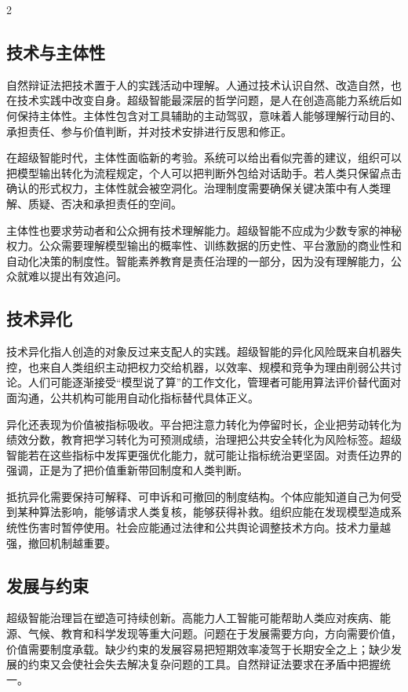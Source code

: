 \documentclass[a4paper,UTF8,zihao=5,twoside]{ctexart}
\begin{document}
\begin{multicols}{2}
\subsection{技术与主体性}

自然辩证法把技术置于人的实践活动中理解。人通过技术认识自然、改造自然，也在技术实践中改变自身。超级智能最深层的哲学问题，是人在创造高能力系统后如何保持主体性。主体性包含对工具辅助的主动驾驭，意味着人能够理解行动目的、承担责任、参与价值判断，并对技术安排进行反思和修正。

在超级智能时代，主体性面临新的考验。系统可以给出看似完善的建议，组织可以把模型输出转化为流程规定，个人可以把判断外包给对话助手。若人类只保留点击确认的形式权力，主体性就会被空洞化。治理制度需要确保关键决策中有人类理解、质疑、否决和承担责任的空间。

主体性也要求劳动者和公众拥有技术理解能力。超级智能不应成为少数专家的神秘权力。公众需要理解模型输出的概率性、训练数据的历史性、平台激励的商业性和自动化决策的制度性。智能素养教育是责任治理的一部分，因为没有理解能力，公众就难以提出有效追问。

\subsection{技术异化}

技术异化指人创造的对象反过来支配人的实践。超级智能的异化风险既来自机器失控，也来自人类组织主动把权力交给机器，以效率、规模和竞争为理由削弱公共讨论。人们可能逐渐接受“模型说了算”的工作文化，管理者可能用算法评价替代面对面沟通，公共机构可能用自动化指标替代具体正义。

异化还表现为价值被指标吸收。平台把注意力转化为停留时长，企业把劳动转化为绩效分数，教育把学习转化为可预测成绩，治理把公共安全转化为风险标签。超级智能若在这些指标中发挥更强优化能力，就可能让指标统治更坚固。对责任边界的强调，正是为了把价值重新带回制度和人类判断。

抵抗异化需要保持可解释、可申诉和可撤回的制度结构。个体应能知道自己为何受到某种算法影响，能够请求人类复核，能够获得补救。组织应能在发现模型造成系统性伤害时暂停使用。社会应能通过法律和公共舆论调整技术方向。技术力量越强，撤回机制越重要。

\subsection{发展与约束}

超级智能治理旨在塑造可持续创新。高能力人工智能可能帮助人类应对疾病、能源、气候、教育和科学发现等重大问题。问题在于发展需要方向，方向需要价值，价值需要制度承载。缺少约束的发展容易把短期效率凌驾于长期安全之上；缺少发展的约束又会使社会失去解决复杂问题的工具。自然辩证法要求在矛盾中把握统一。


\end{multicols}
\end{document}
